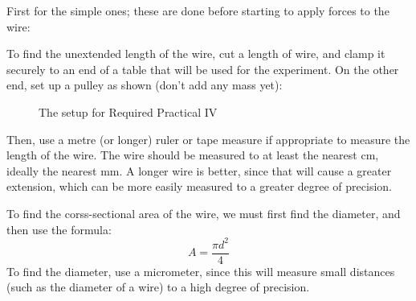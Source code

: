             First for the simple ones; these are done before starting to apply forces to the wire:
            
            To find the unextended length of the wire, cut a length of wire, and clamp it securely to an end of a table that will be used for the experiment.
            On the other end, set up a pulley as shown (don't add any mass yet):

            \begin{figure} \label{fig:required_practical_iv}
                \begin{center}
                \end{center}
                \caption{The setup for Required Practical IV}
            \end{figure}

            Then, use a metre (or longer) ruler or tape measure if appropriate to measure the length of the wire.
            The wire should be measured to at least the nearest cm, ideally the nearest mm.
            A longer wire is better, since that will cause a greater extension, which can be more easily measured to a greater degree of precision.

            To find the corss-sectional area of the wire, we must first find the diameter, and then use the formula:
            \begin{equation}
                A=\frac{\pi d^2}{4}
            \end{equation}
            To find the diameter, use a micrometer, since this will measure small distances (such as the diameter of a wire) to a high degree of precision.

